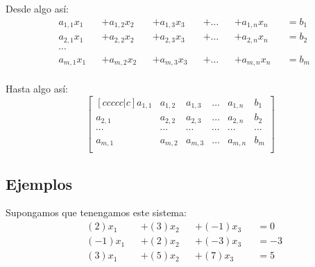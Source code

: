 \documentclass[12pt]{report}                                    %
\begin{document}
                Desde algo así:
                \begin{equation}
                    \begin{split}
                        & a_{1,1}x_1 &&+ a_{1,2}x_2 &&+ a_{1,3}x_3 &&+ \dots &&+ a_{1,n}x_n &&= b_1 \\
                        & a_{2,1}x_1 &&+ a_{2,2}x_2 &&+ a_{2,3}x_3 &&+ \dots &&+ a_{2,n}x_n &&= b_2 \\
                        & \cdots                                                                    \\
                        & a_{m,1}x_1 &&+ a_{m,2}x_2 &&+ a_{m,3}x_3 &&+ \dots &&+ a_{m,n}x_n &&= b_m \\
                    \end{split}
                \end{equation}

                Hasta algo así:
                \begin{equation}
                    \begin{bmatrix}[ccccc|c]
                        a_{1,1} & a_{1,2} & a_{1,3} & \dots  & a_{1,n} & b_1     \\
                        a_{2,1} & a_{2,2} & a_{2,3} & \dots  & a_{2,n} & b_2     \\
                        \cdots  & \cdots  & \cdots  & \cdots & \cdots  & \cdots  \\
                        a_{m,1} & a_{m,2} & a_{m,3} & \dots  & a_{m,n} & b_m     \\
                    \end{bmatrix}
                \end{equation}


            \clearpage
            \subsection{Ejemplos}

                Supongamos que tenengamos este sistema:
                \begin{equation*}
                    \begin{split}
                        &(2)x_1  &&+  (3)x_2 &&+ (-1)x_3 &&= 0    \\
                        &(-1)x_1 &&+  (2)x_2 &&+ (-3)x_3 &&= -3   \\
                        &(3)x_1  &&+  (5)x_2 &&+ (7)x_3  &&= 5    \\
                    \end{split}
                \end{equation*}
\end{document}

